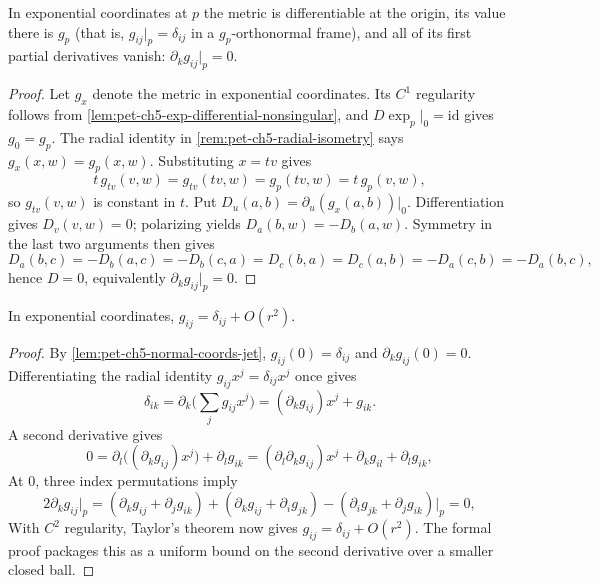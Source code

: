 \begin{lemma}
  \label{lem:pet-ch5-normal-coords-jet}


  In exponential coordinates at $p$ the metric is differentiable at the origin, its
  value there is $g_p$ (that is, $g_{ij}|_p=\delta_{ij}$ in a $g_p$-orthonormal
  frame), and all of its first partial derivatives vanish: $\partial_kg_{ij}|_p=0$.
\end{lemma}
\begin{proof}

  \sketch
  Let $g_x$ denote the metric in exponential coordinates.  Its $C^1$ regularity
  follows from \cref{lem:pet-ch5-exp-differential-nonsingular}, and
  $D\exp_p|_0=\mathrm{id}$ gives $g_0=g_p$.  The radial identity in
  \cref{rem:pet-ch5-radial-isometry} says $g_x(x,w)=g_p(x,w)$.  Substituting
  $x=tv$ gives
  \[
    t\,g_{tv}(v,w)=g_{tv}(tv,w)=g_p(tv,w)=t\,g_p(v,w),
  \]
  so $g_{tv}(v,w)$ is constant in $t$.  Put
  $D_u(a,b)=\partial_u(g_x(a,b))|_0$.  Differentiation gives $D_v(v,w)=0$;
  polarizing yields $D_a(b,w)=-D_b(a,w)$.  Symmetry in the last two arguments then
  gives
  \[
    D_a(b,c)=-D_b(a,c)=-D_b(c,a)=D_c(b,a)=D_c(a,b)=-D_a(c,b)=-D_a(b,c),
  \]
  hence $D=0$, equivalently $\partial_kg_{ij}|_p=0$.
\end{proof}

\begin{lemma}
  \label{lem:pet-ch5-normal-coords-first-order}


  In exponential coordinates, $g_{ij}=\delta_{ij}+O(r^2)$.
\end{lemma}
\begin{proof}

  \sketch
  By \cref{lem:pet-ch5-normal-coords-jet}, $g_{ij}(0)=\delta_{ij}$ and
  $\partial_kg_{ij}(0)=0$.  Differentiating the radial identity
  $g_{ij}x^j=\delta_{ij}x^j$ once gives
  \[
    \delta_{ik}=\partial_k\Big(\sum_jg_{ij}x^j\Big)=(\partial_kg_{ij})x^j+g_{ik}.
  \]
  A second derivative gives
  \[
    0=\partial_l\big((\partial_kg_{ij})x^j\big)+\partial_lg_{ik}
    =(\partial_l\partial_kg_{ij})x^j+\partial_kg_{il}+\partial_lg_{ik},
  \]
  At $0$, three index permutations imply
  \[
    2\partial_kg_{ij}|_p=(\partial_kg_{ij}+\partial_jg_{ik})+(\partial_kg_{ij}+\partial_ig_{jk})
    -(\partial_ig_{jk}+\partial_jg_{ik})\Big|_p=0,
  \]
  With $C^2$ regularity, Taylor's theorem now gives
  $g_{ij}=\delta_{ij}+O(r^2)$. The formal proof packages this as a uniform bound
  on the second derivative over a smaller closed ball.
\end{proof}

